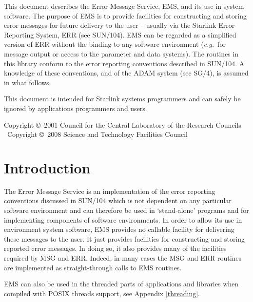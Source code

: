 \documentclass[twoside,11pt]{article}
\newcommand{\stardocinitials}  {SUN}
\newcommand{\stardoccopyright} 
{Copyright \copyright\ 2001 Council for the Central Laboratory of the Research
 Councils \newline\
Copyright \copyright\ 2008 Science and Technology Facilities Council}
\newcommand{\stardocnumber}    {4.14}
\newcommand{\stardocabstract}  {This document describes the Error Message
Service, EMS, and its use in system software.
The purpose of EMS is to provide facilities for constructing and storing
error messages for future delivery to the user -- usually via the Starlink
Error Reporting System, ERR (see
\xref{SUN/104}{sun104}{err_error_reporting_system}).
EMS can be regarded as a simplified version of ERR without the binding to
any software environment (\textit{e.g.}\ for message output or access to the
parameter and data systems).
The routines in this library conform to the error reporting conventions
described in SUN/104.
A knowledge of these conventions, and of the ADAM system
(see \xref{SG/4}{sg4}{}), is assumed in what follows.

This document is intended for Starlink systems programmers and can safely be
ignored by applications programmers and users.}
\newcommand{\stardocname}{\stardocinitials /\stardocnumber}
\newenvironment{latexonly}{}{}
\newcommand{\xref}[3]{#1}
\newcommand{\xlabel}[1]{}
\renewcommand{\_}{\texttt{\symbol{95}}}
\renewcommand{\thepage}{\roman{page}}
\begin{document}
\stardocabstract

\begin{latexonly}
\newpage
\vspace*{\fill}
\stardoccopyright
\end{latexonly}

  \newpage
  \begin{latexonly}
    \setlength{\parskip}{0mm}
    \tableofcontents
    \setlength{\parskip}{\medskipamount}
    \markboth{\stardocname}{\stardocname}
  \end{latexonly}

\cleardoublepage
\renewcommand{\thepage}{\arabic{page}}
\setcounter{page}{1}


\section{\xlabel{introduction}Introduction}

The Error Message Service is an implementation of the error reporting 
conventions discussed in 
\xref{SUN/104}{sun104}{err_error_reporting_system} 
which is not dependent on any particular software environment and can
therefore be used in `stand-alone' programs and for implementing components of
software environments.
In order to allow its use in environment system software, EMS provides
no callable facility for delivering these messages to the user.
It just provides facilities for constructing and storing reported error
messages.
In doing so, it also provides many of the facilities required by 
\xref{MSG and ERR}{sun104}{}. Indeed, in many cases the MSG and ERR routines
are implemented as straight-through calls to EMS routines.

EMS can also be used in the threaded parts of applications and libraries
when compiled with POSIX threads support, see Appendix \ref{threading}.
\end{document}
